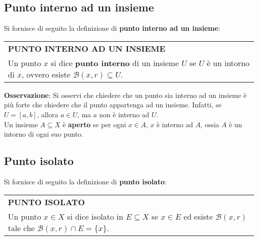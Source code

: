 \documentclass[a4paper]{extarticle}
\renewcommand\arraystretch{}
\begin{document}
\subsection{Punto interno ad un insieme}
Si fornisce di seguito la definizione di \textbf{punto interno ad un insieme}:

\vspace{1em}
\setlength{\tabcolsep}{14pt}
\renewcommand{\arraystretch}{2}
\noindent
\begin{tabularx}{\textwidth}{@{}|P|@{}}
    \hline
    {\textbf{PUNTO INTERNO AD UN INSIEME}}\\
    \parbox{\linewidth}{Un punto $x$ si dice \textbf{punto interno} di un insieme $U$ se $U$ è un intorno di $x$, ovvero esiste $\mathcal{B}(x,r) \subseteq U$. \vspace{3mm}}\\
    \hline
\end{tabularx}

\vspace{1em}
\noindent
\textbf{Osservazione}: Si osservi che chiedere che un punto sia interno ad un insieme è più forte che chiedere che il punto appartenga ad un insieme. Infatti, se $U = [a,b]$, allora $a \in U$, ma $a$ non è interno ad $U$.\\
Un insieme $A \subseteq X$ è \textbf{aperto} se per ogni $x \in A$, $x$ è interno ad $A$, ossia $A$ è un intorno di ogni suo punto.

\vspace{1em}
\noindent
\subsection{Punto isolato}
Si fornisce di seguito la definizione di \textbf{punto isolato}:

\vspace{1em}
\setlength{\tabcolsep}{14pt}
\renewcommand{\arraystretch}{2}
\noindent
\begin{tabularx}{\textwidth}{@{}|P|@{}}
    \hline
    {\textbf{PUNTO ISOLATO}}\\
    \parbox{\linewidth}{Un punto $x \in X$ si dice isolato in $E \subseteq X$ se $x \in E$ ed esiste $\mathcal{B}(x,r)$ tale che $\mathcal{B}(x,r) \cap E = \{x\}$. \vspace{3mm}}\\
    \hline
\end{tabularx}
\end{document}

